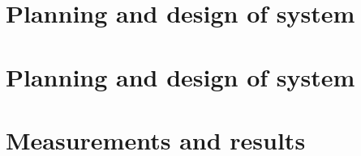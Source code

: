 \documentclass[a4paper,12pt]{report}
\begin{document}
\chapter{ Planning and design of system}


\chapter{ Planning and design of system}


\chapter{ Measurements and results}

\cite{latexcompanion}



\end{document}

